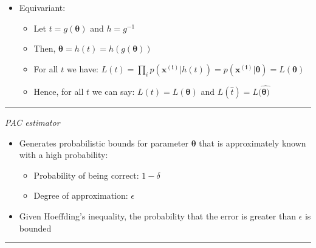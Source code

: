 \begin{itemize}
\begin{itemize}
\begin{itemize}
        \end{itemize}
        \item Equivariant: 
        \begin{itemize}
            \item Let $t = g(\boldsymbol{\theta})$ and $h = g^{-1}$ 
            \item Then, $\boldsymbol{\theta} = h(t) = h(g(\boldsymbol{\theta}))$
            \item For all $t$ we have: $L(t) = \prod_i p(\boldsymbol{x^({i})} | h(t)) = p(\boldsymbol{x^({i})} | \boldsymbol{\theta}) = L(\boldsymbol{\theta})$
            \item Hence, for all $t$ we can say: $L(t) = L(\boldsymbol{\theta})$ and $L(\hat{t}) = L(\hat{\boldsymbol{\theta})}$
        \end{itemize}
    \end{itemize}
\end{itemize}

{\color{lightgray}\hrule height 0.001mm}

\emph{PAC estimator}
\begin{itemize}
    \item Generates probabilistic bounds for parameter $\boldsymbol{\theta}$ that is approximately known with a high probability:
    \begin{itemize}
        \item Probability of being correct: $1-\delta$
        \item Degree of approximation: $\epsilon$
    \end{itemize}
    \item Given Hoeffding's inequality, the probability that the error is greater than $\epsilon$ is bounded
\end{itemize}

{\color{black}\hrule height 0.001mm}

